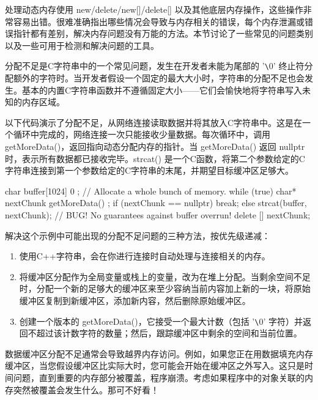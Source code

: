 
处理动态内存使用 new/delete/new[]/delete[] 以及其他底层内存操作，这些操作非常容易出错。很难准确指出哪些情况会导致与内存相关的错误，每个内存泄漏或错误指针都有差别，解决内存问题没有万能的方法。本节讨论了一些常见的问题类别以及一些可用于检测和解决问题的工具。


分配不足是C字符串中的一个常见问题，发生在开发者未能为尾部的 '\verb|\|0' 终止符分配额外的字符时。当开发者假设一个固定的最大大小时，字符串的分配不足也会发生。基本的内置C字符串函数并不遵循固定大小——它们会愉快地将字符串写入未知的内存区域。

以下代码演示了分配不足，从网络连接读取数据并将其放入C字符串中。这是在一个循环中完成的，网络连接一次只能接收少量数据。每次循环中，调用 getMoreData()，返回指向动态分配内存的指针。当 getMoreData() 返回 nullptr 时，表示所有数据都已接收完毕。strcat() 是一个C函数，将第二个参数给定的C字符串连接到第一个参数给定的C字符串的末尾，并期望目标缓冲区足够大。

\begin{cpp}
char buffer[1024] { 0 }; // Allocate a whole bunch of memory.
while (true) {
    char* nextChunk { getMoreData() };
    if (nextChunk == nullptr) {
        break;
    } else {
        strcat(buffer, nextChunk); // BUG! No guarantees against buffer overrun!
        delete [] nextChunk;
    }
}
\end{cpp}

解决这个示例中可能出现的分配不足问题的三种方法，按优先级递减：

\begin{enumerate}
\item
使用C++字符串，会在你进行连接时自动处理与连接相关的内存。

\item
将缓冲区分配作为全局变量或栈上的变量，改为在堆上分配。当剩余空间不足时，分配一个新的足够大的缓冲区来至少容纳当前内容加上新的一块，将原始缓冲区复制到新缓冲区，添加新内容，然后删除原始缓冲区。

\item
创建一个版本的 getMoreData()，它接受一个最大计数（包括 '\verb|\|0' 字符）并返回不超过该计数字符的数量；然后，跟踪缓冲区中剩余的空间和当前位置。
\end{enumerate}
数据缓冲区分配不足通常会导致越界内存访问。例如，如果您正在用数据填充内存缓冲区，当您假设缓冲区比实际大时，您可能会开始在缓冲区之外写入。这只是时间问题，直到重要的内存部分被覆盖，程序崩溃。考虑如果程序中的对象关联的内存突然被覆盖会发生什么。那可不好看！

